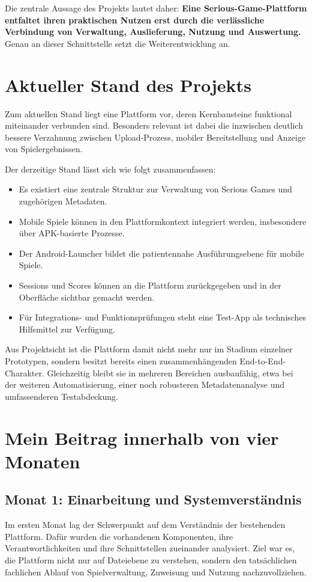 \documentclass[12pt,a4paper]{article}
\begin{document}
Die zentrale Aussage des Projekts lautet daher: \textbf{Eine Serious-Game-Plattform entfaltet ihren praktischen Nutzen erst durch die verlässliche Verbindung von Verwaltung, Auslieferung, Nutzung und Auswertung.} Genau an dieser Schnittstelle setzt die Weiterentwicklung an.

\section{Aktueller Stand des Projekts}
Zum aktuellen Stand liegt eine Plattform vor, deren Kernbausteine funktional miteinander verbunden sind. Besonders relevant ist dabei die inzwischen deutlich bessere Verzahnung zwischen Upload-Prozess, mobiler Bereitstellung und Anzeige von Spielergebnissen.

Der derzeitige Stand lässt sich wie folgt zusammenfassen:

\begin{itemize}[leftmargin=1.5em]
  \item Es existiert eine zentrale Struktur zur Verwaltung von Serious Games und zugehörigen Metadaten.
  \item Mobile Spiele können in den Plattformkontext integriert werden, insbesondere über APK-basierte Prozesse.
  \item Der Android-Launcher bildet die patientennahe Ausführungsebene für mobile Spiele.
  \item Sessions und Scores können an die Plattform zurückgegeben und in der Oberfläche sichtbar gemacht werden.
  \item Für Integrations- und Funktionsprüfungen steht eine Test-App als technisches Hilfsmittel zur Verfügung.
\end{itemize}

Aus Projektsicht ist die Plattform damit nicht mehr nur im Stadium einzelner Prototypen, sondern besitzt bereits einen zusammenhängenden End-to-End-Charakter. Gleichzeitig bleibt sie in mehreren Bereichen ausbaufähig, etwa bei der weiteren Automatisierung, einer noch robusteren Metadatenanalyse und umfassenderen Testabdeckung.

\section{Mein Beitrag innerhalb von vier Monaten}
\subsection{Monat 1: Einarbeitung und Systemverständnis}
Im ersten Monat lag der Schwerpunkt auf dem Verständnis der bestehenden Plattform. Dafür wurden die vorhandenen Komponenten, ihre Verantwortlichkeiten und ihre Schnittstellen zueinander analysiert. Ziel war es, die Plattform nicht nur auf Dateiebene zu verstehen, sondern den tatsächlichen fachlichen Ablauf von Spielverwaltung, Zuweisung und Nutzung nachzuvollziehen.
\end{document}

